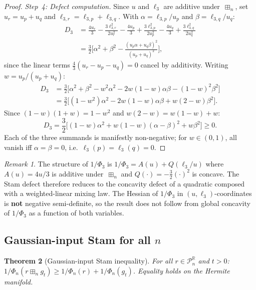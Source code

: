 \documentclass[10pt,a4paper]{amsart}
\theoremstyle{plain}
\newtheorem{theorem}{Theorem}[section]
\theoremstyle{definition}
\theoremstyle{remark}
\newtheorem{remark}[theorem]{Remark}
\newcommand{\R}{\mathbb{R}}
\newcommand{\PnR}[1][n]{\mathcal{P}^{\R}_{#1}}
\newcommand{\fp}{\boxplus_n}
\begin{document}
\begin{proof}
\emph{Step~4: Defect computation.}
Since $u$ and $\ell_3$ are additive
under~$\fp$, set $u_r=u_p+u_q$ and
$\ell_{3,r}=\ell_{3,p}+\ell_{3,q}$.
With $\alpha=\ell_{3,p}/u_p$ and
$\beta=\ell_{3,q}/u_q$:
\begin{align*}
  D_3 &= \frac{4u_r}{3}
         -\frac{3\ell_{3,r}^2}{2u_r^2}
         -\frac{4u_p}{3}
         +\frac{3\ell_{3,p}^2}{2u_p^2}
         -\frac{4u_q}{3}
         +\frac{3\ell_{3,q}^2}{2u_q^2}\\[4pt]
      &= \frac{3}{2}\biggl[
           \alpha^2+\beta^2
           -\frac{(u_p\alpha+u_q\beta)^2}
                 {(u_p+u_q)^2}
         \biggr],
\end{align*}
since the linear terms
$\tfrac{4}{3}(u_r{-}u_p{-}u_q)=0$
cancel by additivity.
Writing $w=u_p/(u_p+u_q)$:
\begin{align*}
  D_3 &= \frac{3}{2}\bigl[
    \alpha^2+\beta^2
    -w^2\alpha^2
    -2w(1{-}w)\alpha\beta
    -(1{-}w)^2\beta^2
  \bigr]\\[4pt]
  &= \frac{3}{2}\bigl[
    (1{-}w^2)\alpha^2
    -2w(1{-}w)\alpha\beta
    +w(2{-}w)\beta^2
  \bigr].
\end{align*}
Since $(1{-}w)(1{+}w)=1{-}w^2$
and $w(2{-}w)=w(1{-}w)+w$:
\[
  D_3 = \frac{3}{2}\bigl[
    (1{-}w)\alpha^2
    +w(1{-}w)(\alpha{-}\beta)^2
    +w\beta^2
  \bigr]\ge 0.
\]
Each of the three summands is
manifestly non-negative;
for $w\in(0,1)$, all vanish iff
$\alpha=\beta=0$,
i.e.\ $\ell_3(p)=\ell_3(q)=0$.
\end{proof}

\begin{remark}\label{rem:n3-mech}
The structure of $1/\Phi_3$ is
$1/\Phi_3=A(u)+Q(\ell_3/u)$ where
$A(u)=4u/3$ is additive under~$\fp$ and
$Q(\cdot)=-\tfrac{3}{2}(\cdot)^2$ is concave.
The Stam defect therefore reduces to
the concavity defect of a quadratic
composed with a weighted-linear mixing law.
The Hessian of $1/\Phi_3$ in
$(u,\ell_3)$-coordinates is \textbf{not}
negative semi-definite, so the result does
not follow from global concavity of
$1/\Phi_3$ as a function of both variables.
\end{remark}

\subsection{Gaussian-input Stam for all \texorpdfstring{$n$}{n}}

\begin{theorem}[Gaussian-input Stam inequality]
\label{thm:stam-gauss}
For all $r\in\PnR$ and $t>0$:
$1/\Phi_n(r\fp g_t)\ge 1/\Phi_n(r)+1/\Phi_n(g_t)$.
Equality holds on the Hermite manifold.
\end{theorem}
\end{document}
